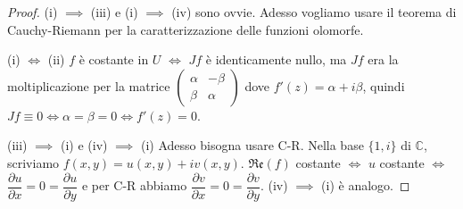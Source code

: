 \begin{proof}
  (i) $\implies$ (iii) e (i) $\implies$ (iv) sono ovvie. Adesso vogliamo usare il teorema di Cauchy-Riemann per la caratterizzazione delle funzioni olomorfe.

  (i) $\iff$ (ii) $f$ è costante in $U$ $\iff$ $Jf$ è identicamente nullo, ma $Jf$ era la moltiplicazione per la matrice $\begin{pmatrix}
    \alpha & -\beta\\
    \beta & \alpha
\end{pmatrix}$ dove $f'(z)=\alpha+i\beta$, quindi $Jf \equiv 0 \iff \alpha =\beta=0 \iff f'(z)=0$.

(iii) $\implies$ (i) e (iv) $\implies$ (i) Adesso bisogna usare C-R. Nella base $\{1, i\}$ di $\mathbb{C}$, scriviamo $f(x, y)=u(x, y)+iv(x, y)$.
$\mathfrak{Re}(f)$ costante $\iff$ $u$ costante $\iff$ $\dfrac{\partial u}{\partial x}=0=\dfrac{\partial u}{\partial y}$ e per C-R abbiamo $\dfrac{\partial v}{\partial x}=0=\dfrac{\partial v}{\partial y}$. (iv) $\implies$ (i) è analogo.
\end{proof}
